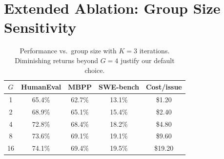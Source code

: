 \section{Extended Ablation: Group Size Sensitivity}

\label{app:group-size}

\begin{table}[h]
\centering
\begin{tabular}{ccccc}
\toprule
$G$ & HumanEval & MBPP & SWE-bench & Cost/issue \\
\midrule
1 & 65.4\% & 62.7\% & 13.1\% & \$1.20 \\
2 & 68.9\% & 65.1\% & 15.4\% & \$2.40 \\
4 & 72.8\% & 68.4\% & 18.2\% & \$4.80 \\
8 & 73.6\% & 69.1\% & 19.1\% & \$9.60 \\
16 & 74.1\% & 69.4\% & 19.5\% & \$19.20 \\
\bottomrule
\end{tabular}
\caption{Performance vs.\ group size with $K=3$ iterations. Diminishing
returns beyond $G=4$ justify our default choice.}
\label{tab:group-sensitivity}
\end{table}

